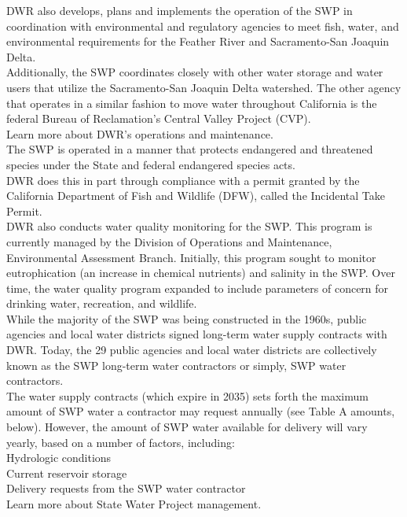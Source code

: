 \documentclass{article}
\begin{document}
DWR also develops, plans and implements the operation of the SWP in coordination with environmental and regulatory agencies to meet fish, water, and environmental requirements for the Feather River and Sacramento-San Joaquin Delta.\\

Additionally, the SWP coordinates closely with other water storage and water users that utilize the Sacramento-San Joaquin Delta watershed. The other agency that operates in a similar fashion to move water throughout California is the federal Bureau of Reclamation’s Central Valley Project (CVP).  \\

Learn more about DWR's operations and maintenance.\\

The SWP is operated in a manner that protects endangered and threatened species under the State and federal endangered species acts.\\

DWR does this in part through compliance with a permit granted by the California Department of Fish and Wildlife (DFW), called the Incidental Take Permit.\\

DWR also conducts water quality monitoring for the SWP. This program is currently managed by the Division of Operations and Maintenance,  Environmental Assessment Branch. Initially, this program sought to monitor eutrophication (an increase in chemical nutrients) and salinity in the SWP. Over time, the water quality program expanded to include parameters of concern for drinking water, recreation, and wildlife.\\

While the majority of the SWP was being constructed in the 1960s, public agencies and local water districts signed long-term water supply contracts with DWR. Today, the 29 public agencies and local water districts are collectively known as the SWP long-term water contractors or simply, SWP water contractors.\\

The water supply contracts (which expire in 2035) sets forth the maximum amount of SWP water a contractor may request annually (see Table A amounts, below). However, the amount of SWP water available for delivery will vary yearly, based on a number of factors, including:\\

Hydrologic conditions\\
Current reservoir storage\\
Delivery requests from the SWP water contractor\\
Learn more about State Water Project management.\\
\end{document}
